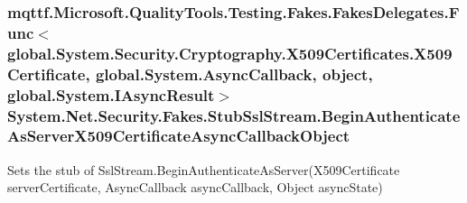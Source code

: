\hypertarget{class_system_1_1_net_1_1_security_1_1_fakes_1_1_stub_ssl_stream_aad4faaf059a8ea40dbb004f1b4f37bc8}{
\subsubsection[{Begin\-Authenticate\-As\-Server\-X509\-Certificate\-Async\-Callback\-Object}]{\setlength{\rightskip}{0pt plus 5cm}mqttf.\-Microsoft.\-Quality\-Tools.\-Testing.\-Fakes.\-Fakes\-Delegates.\-Func$<$global.\-System.\-Security.\-Cryptography.\-X509\-Certificates.\-X509\-Certificate, global.\-System.\-Async\-Callback, object, global.\-System.\-I\-Async\-Result$>$ System.\-Net.\-Security.\-Fakes.\-Stub\-Ssl\-Stream.\-Begin\-Authenticate\-As\-Server\-X509\-Certificate\-Async\-Callback\-Object}}\label{class_system_1_1_net_1_1_security_1_1_fakes_1_1_stub_ssl_stream_aad4faaf059a8ea40dbb004f1b4f37bc8}


Sets the stub of Ssl\-Stream.\-Begin\-Authenticate\-As\-Server(\-X509\-Certificate server\-Certificate, Async\-Callback async\-Callback, Object async\-State)

